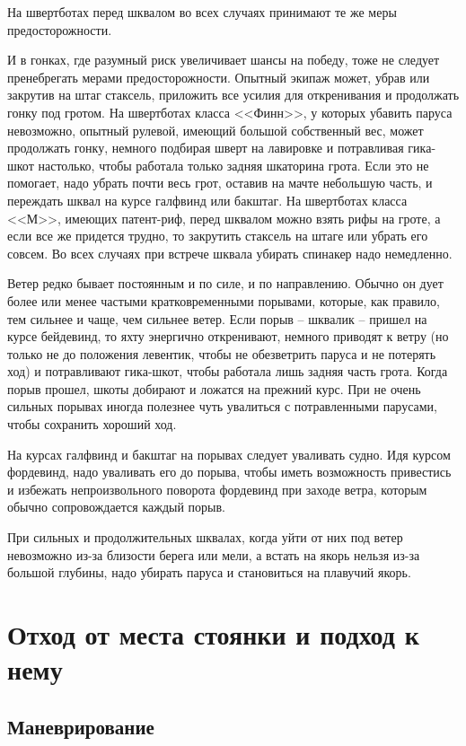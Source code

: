 \documentclass[a4paper, 12pt, twoside, final]{scrbook}
\begin{document}
На швертботах перед шквалом во всех случаях принимают те же меры предосторожности. 

И в гонках, где разумный риск увеличивает шансы на победу, тоже не следует пренебрегать мерами предосторожности. Опытный экипаж может, убрав или закрутив на штаг стаксель, приложить все усилия для откренивания и продолжать гонку под гротом. На швертботах класса <<Финн>>, у которых убавить паруса невозможно, опытный рулевой, имеющий большой собственный вес, может продолжать гонку, немного подбирая шверт на лавировке и потравливая гика-шкот настолько, чтобы работала только задняя шкаторина грота. Если это не помогает, надо убрать почти весь грот, оставив на мачте небольшую часть, и переждать шквал на курсе галфвинд или бакштаг. На швертботах класса <<М>>, имеющих патент-риф, перед шквалом можно взять рифы на гроте, а если все же придется трудно, то закрутить стаксель на штаге или убрать его совсем. Во всех случаях при встрече шквала убирать спинакер надо немедленно. 

Ветер редко бывает постоянным и по силе, и по направлению. Обычно он дует более или менее частыми кратковременными порывами, которые, как правило, тем сильнее и чаще, чем сильнее ветер. Если порыв \--- шквалик \--- пришел на курсе бейдевинд, то яхту энергично откренивают, немного приводят к ветру (но только не до положения левентик, чтобы не обезветрить паруса и не потерять ход) и потравливают гика-шкот, чтобы работала лишь задняя часть грота. Когда порыв прошел, шкоты добирают и ложатся на прежний курс. При не очень сильных порывах иногда полезнее чуть увалиться с потравленными парусами, чтобы сохранить хороший ход. 

На курсах галфвинд и бакштаг на порывах следует уваливать судно. Идя курсом фордевинд, надо уваливать его до порыва, чтобы иметь возможность привестись и избежать непроизвольного поворота фордевинд при заходе ветра, которым обычно сопровождается каждый порыв. 

При сильных и продолжительных шквалах, когда уйти от них под ветер невозможно из-за близости берега или мели, а встать на якорь нельзя из-за большой глубины, надо убирать паруса и становиться на плавучий якорь. 

\chapter{Отход от места стоянки и подход к нему}

\section{Маневрирование}
\end{document}
